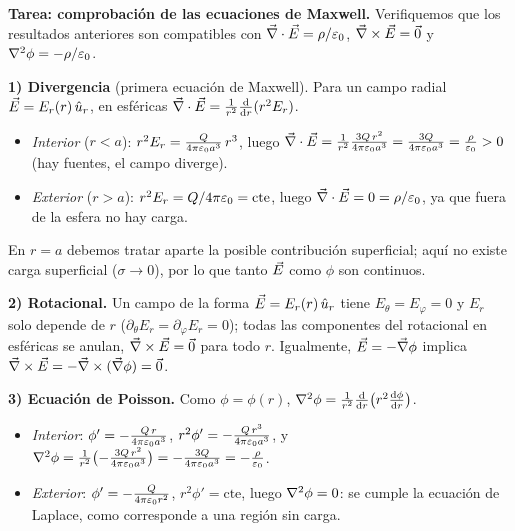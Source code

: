 \textbf{Tarea: comprobación de las ecuaciones de Maxwell.} Verifiquemos que los resultados anteriores son compatibles con $\vec{\nabla}\cdot\vec{E}=\rho/\varepsilon_{0}$, $\vec{\nabla}\times\vec{E}=\vec{0}$ y $\nabla^{2}\phi=-\rho/\varepsilon_{0}$.

\begin{resolucion}[Comprobación]
\textbf{1) Divergencia} (primera ecuación de Maxwell). Para un campo radial $\vec{E}=E_r(r)\,\hat{u}_{r}$, en esféricas $\vec{\nabla}\cdot\vec{E}=\frac{1}{r^{2}}\frac{\mathrm{d}}{\mathrm{d} r}(r^{2}E_r)$.
\begin{itemize}
  \item \emph{Interior} ($r<a$): $r^{2}E_r=\frac{Q}{4\pi\varepsilon_{0} a^{3}}\,r^{3}$, luego $\vec{\nabla}\cdot\vec{E}=\frac{1}{r^{2}}\frac{3Q\,r^{2}}{4\pi\varepsilon_{0} a^{3}}=\frac{3Q}{4\pi\varepsilon_{0} a^{3}}=\frac{\rho}{\varepsilon_{0}}>0$ (hay fuentes, el campo diverge).
  \item \emph{Exterior} ($r>a$): $r^{2}E_r=Q/4\pi\varepsilon_{0}=\text{cte}$, luego $\vec{\nabla}\cdot\vec{E}=0=\rho/\varepsilon_{0}$, ya que fuera de la esfera no hay carga.
\end{itemize}
En $r=a$ debemos tratar aparte la posible contribución superficial; aquí no existe carga superficial ($\sigma\to0$), por lo que tanto $\vec{E}$ como $\phi$ son continuos.

\textbf{2) Rotacional.} Un campo de la forma $\vec{E}=E_r(r)\,\hat{u}_{r}$ tiene $E_\theta=E_\varphi=0$ y $E_r$ solo depende de $r$ ($\partial_\theta E_r=\partial_\varphi E_r=0$); todas las componentes del rotacional en esféricas se anulan,
$\vec{\nabla}\times\vec{E}=\vec{0}$ para todo $r$. Igualmente, $\vec{E}=-\vec{\nabla}\phi$ implica $\vec{\nabla}\times\vec{E}=-\vec{\nabla}\times(\vec{\nabla}\phi)=\vec{0}$.

\textbf{3) Ecuación de Poisson.} Como $\phi=\phi(r)$, $\nabla^{2}\phi=\frac{1}{r^{2}}\frac{\mathrm{d}}{\mathrm{d} r}\bigl(r^{2}\frac{\mathrm{d}\phi}{\mathrm{d} r}\bigr)$.
\begin{itemize}
  \item \emph{Interior}: $\phi'=-\frac{Q\,r}{4\pi\varepsilon_{0} a^{3}}$, $r^{2}\phi'=-\frac{Q\,r^{3}}{4\pi\varepsilon_{0} a^{3}}$, y $\nabla^{2}\phi=\frac{1}{r^{2}}\bigl(-\frac{3Q\,r^{2}}{4\pi\varepsilon_{0} a^{3}}\bigr)=-\frac{3Q}{4\pi\varepsilon_{0} a^{3}}=-\frac{\rho}{\varepsilon_{0}}$.
  \item \emph{Exterior}: $\phi'=-\frac{Q}{4\pi\varepsilon_{0} r^{2}}$, $r^{2}\phi'=\text{cte}$, luego $\nabla^{2}\phi=0$: se cumple la ecuación de Laplace, como corresponde a una región sin carga.
\end{itemize}
\end{resolucion}



